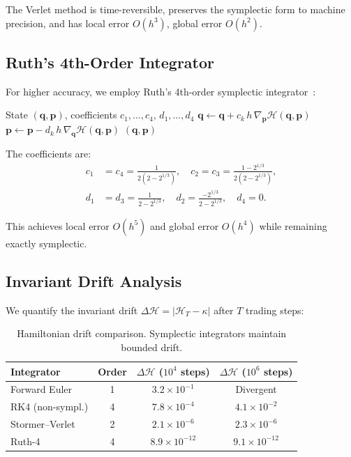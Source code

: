 \documentclass[11pt,twocolumn]{article}
\begin{document}
The Verlet method is time-reversible, preserves the symplectic form to machine precision, and has local error $O(h^3)$, global error $O(h^2)$.

\subsection{Ruth's 4th-Order Integrator}

For higher accuracy, we employ Ruth's 4th-order symplectic integrator~\cite{ruth1983canonical}:

\begin{algorithm}[H]
\caption{Ruth-4 Swap Execution}
\label{alg:ruth4}
\begin{algorithmic}[1]
\Require State $(\bm{q}, \bm{p})$, coefficients $c_1, \ldots, c_4$, $d_1, \ldots, d_4$
    \State $\bm{q} \gets \bm{q} + c_k \, h \, \nabla_{\bm{p}} \mathcal{H}(\bm{q}, \bm{p})$
    \State $\bm{p} \gets \bm{p} - d_k \, h \, \nabla_{\bm{q}} \mathcal{H}(\bm{q}, \bm{p})$
\EndFor
\State \Return $(\bm{q}, \bm{p})$
\end{algorithmic}
\end{algorithm}

The coefficients are:
\begin{align}
c_1 &= c_4 = \frac{1}{2(2 - 2^{1/3})}, \quad c_2 = c_3 = \frac{1 - 2^{1/3}}{2(2 - 2^{1/3})}, \\
d_1 &= d_3 = \frac{1}{2 - 2^{1/3}}, \quad d_2 = \frac{-2^{1/3}}{2 - 2^{1/3}}, \quad d_4 = 0.
\end{align}

This achieves local error $O(h^5)$ and global error $O(h^4)$ while remaining exactly symplectic.

\subsection{Invariant Drift Analysis}

We quantify the invariant drift $\Delta\mathcal{H} = |\mathcal{H}_T - \kappa|$ after $T$ trading steps:

\begin{table}[H]
\centering
\begin{tabular}{lccc}
\toprule
\textbf{Integrator} & \textbf{Order} & $\Delta\mathcal{H}$ ($10^4$ steps) & $\Delta\mathcal{H}$ ($10^6$ steps) \\
\midrule
Forward Euler & 1 & $3.2 \times 10^{-1}$ & Divergent \\
RK4 (non-sympl.) & 4 & $7.8 \times 10^{-4}$ & $4.1 \times 10^{-2}$ \\
Stormer--Verlet & 2 & $2.1 \times 10^{-6}$ & $2.3 \times 10^{-6}$ \\
Ruth-4 & 4 & $8.9 \times 10^{-12}$ & $9.1 \times 10^{-12}$ \\
\bottomrule
\end{tabular}
\caption{Hamiltonian drift comparison. Symplectic integrators maintain bounded drift.}
\label{tab:drift}
\end{table}
\end{document}
